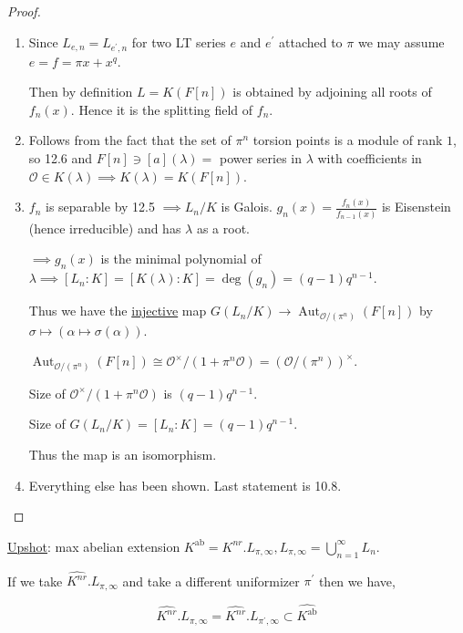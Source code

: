 \documentclass[openany]{amsbook}
\numberwithin{section}{chapter}
\theoremstyle{definition}
\begin{document}
\begin{proof}
    \begin{enumerate}[label=\roman*)]
        \item Since \(L_{e,n} = L_{e^{\prime},n}\) for two LT series \(e\) and \(e^{\prime}\) attached to \(\pi\) we may assume \(e = f = \pi x + x^q\).
        
        Then by definition \(L = K(F[n])\) is obtained by adjoining all roots of \(f_n(x)\). Hence it is the splitting field of \(f_n\).

        \item Follows from the fact that the set of \(\pi^n\) torsion points is a module of rank \(1\), so 12.6 and \(F[n]\ni [a](\lambda) =\) power series in \(\lambda\) with coefficients in \(\mathcal{O} \in K(\lambda) \implies K(\lambda) = K(F[n])\).
        
        \item \(f_n\) is separable by 12.5 \(\implies L_n / K\) is Galois. \(g_n(x) = \frac{f_n(x)}{f_{n-1} (x)}\) is Eisenstein (hence irreducible) and has \(\lambda\) as a root. 
        
        \(\implies g_n (x)\) is the minimal polynomial of \(\lambda \implies [L_n : K] = [K(\lambda):K] = \deg(g_n) = (q-1)q^{n-1}\).

        Thus we have the \underline{injective} map \(G(L_n / K) \to \operatorname{Aut}_{\mathcal{O} / (\pi^n)}(F[n])\) by \(\sigma \mapsto (\alpha \mapsto \sigma(\alpha))\).

        \(\operatorname{Aut}_{\mathcal{O} / (\pi^n)}(F[n]) \cong \mathcal{O}^\times / (1+\pi^n \mathcal{O}) = (\mathcal{O} / (\pi^n))^\times\).

        Size of \(\mathcal{O}^\times /(1+\pi^n \mathcal{O})\) is \((q-1)q^{n-1}\).

        Size of \(G(L_n / K) = [L_n : K] = (q-1)q^{n-1}\).

        Thus the map is an isomorphism.

        \item Everything else has been shown. Last statement is 10.8.
    \end{enumerate} 
\end{proof}

\underline{Upshot}: max abelian extension \(K^{\text{ab}} = K^{nr} . L_{\pi,\infty}, L_{\pi,\infty} = \bigcup_{n=1}^{\infty} L_n \).

If we take \(\widehat{K^{nr}} . L_{\pi, \infty}\) and take a different uniformizer \(\pi^{\prime}\) then we have,

\[
    \widehat{K^{nr}} . L_{\pi, \infty} = \widehat{K^{nr}}.L_{\pi^{\prime}, \infty} \subset \widehat{K^{\text{ab}}}
\]
\end{document}
